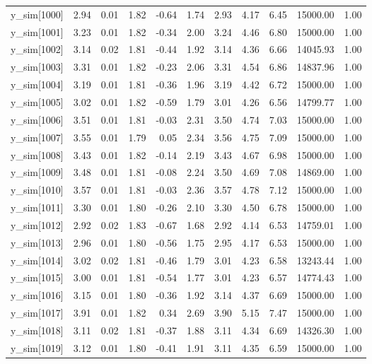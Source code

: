 \begin{table}[ht]
\begin{tabular}{rrrrrrrrrrr}
  y\_sim[1000] & 2.94 & 0.01 & 1.82 & -0.64 & 1.74 & 2.93 & 4.17 & 6.45 & 15000.00 & 1.00 \\ 
  y\_sim[1001] & 3.23 & 0.01 & 1.82 & -0.34 & 2.00 & 3.24 & 4.46 & 6.80 & 15000.00 & 1.00 \\ 
  y\_sim[1002] & 3.14 & 0.02 & 1.81 & -0.44 & 1.92 & 3.14 & 4.36 & 6.66 & 14045.93 & 1.00 \\ 
  y\_sim[1003] & 3.31 & 0.01 & 1.82 & -0.23 & 2.06 & 3.31 & 4.54 & 6.86 & 14837.96 & 1.00 \\ 
  y\_sim[1004] & 3.19 & 0.01 & 1.81 & -0.36 & 1.96 & 3.19 & 4.42 & 6.72 & 15000.00 & 1.00 \\ 
  y\_sim[1005] & 3.02 & 0.01 & 1.82 & -0.59 & 1.79 & 3.01 & 4.26 & 6.56 & 14799.77 & 1.00 \\ 
  y\_sim[1006] & 3.51 & 0.01 & 1.81 & -0.03 & 2.31 & 3.50 & 4.74 & 7.03 & 15000.00 & 1.00 \\ 
  y\_sim[1007] & 3.55 & 0.01 & 1.79 & 0.05 & 2.34 & 3.56 & 4.75 & 7.09 & 15000.00 & 1.00 \\ 
  y\_sim[1008] & 3.43 & 0.01 & 1.82 & -0.14 & 2.19 & 3.43 & 4.67 & 6.98 & 15000.00 & 1.00 \\ 
  y\_sim[1009] & 3.48 & 0.01 & 1.81 & -0.08 & 2.24 & 3.50 & 4.69 & 7.08 & 14869.00 & 1.00 \\ 
  y\_sim[1010] & 3.57 & 0.01 & 1.81 & -0.03 & 2.36 & 3.57 & 4.78 & 7.12 & 15000.00 & 1.00 \\ 
  y\_sim[1011] & 3.30 & 0.01 & 1.80 & -0.26 & 2.10 & 3.30 & 4.50 & 6.78 & 15000.00 & 1.00 \\ 
  y\_sim[1012] & 2.92 & 0.02 & 1.83 & -0.67 & 1.68 & 2.92 & 4.14 & 6.53 & 14759.01 & 1.00 \\ 
  y\_sim[1013] & 2.96 & 0.01 & 1.80 & -0.56 & 1.75 & 2.95 & 4.17 & 6.53 & 15000.00 & 1.00 \\ 
  y\_sim[1014] & 3.02 & 0.02 & 1.81 & -0.46 & 1.79 & 3.01 & 4.23 & 6.58 & 13243.44 & 1.00 \\ 
  y\_sim[1015] & 3.00 & 0.01 & 1.81 & -0.54 & 1.77 & 3.01 & 4.23 & 6.57 & 14774.43 & 1.00 \\ 
  y\_sim[1016] & 3.15 & 0.01 & 1.80 & -0.36 & 1.92 & 3.14 & 4.37 & 6.69 & 15000.00 & 1.00 \\ 
  y\_sim[1017] & 3.91 & 0.01 & 1.82 & 0.34 & 2.69 & 3.90 & 5.15 & 7.47 & 15000.00 & 1.00 \\ 
  y\_sim[1018] & 3.11 & 0.02 & 1.81 & -0.37 & 1.88 & 3.11 & 4.34 & 6.69 & 14326.30 & 1.00 \\ 
  y\_sim[1019] & 3.12 & 0.01 & 1.80 & -0.41 & 1.91 & 3.11 & 4.35 & 6.59 & 15000.00 & 1.00 \\ 

\end{tabular}
\end{table}
